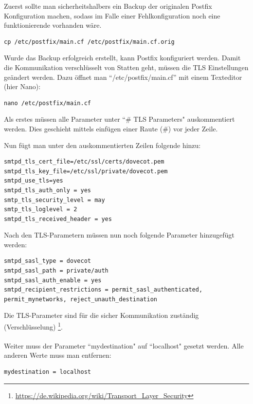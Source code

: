 Zuerst sollte man sicherheitshalbers ein Backup der originalen Postfix Konfiguration machen, sodass im Falle einer Fehlkonfiguration noch eine funktionierende vorhanden wäre. 

\begin{lstlisting}
cp /etc/postfix/main.cf /etc/postfix/main.cf.orig
\end{lstlisting}

Wurde das Backup erfolgreich erstellt, kann Postfix konfiguriert werden. Damit die Kommunikation verschlüsselt von Statten geht, müssen die TLS Einstellungen geändert werden.
Dazu öffnet man ``/etc/postfix/main.cf'' mit einem Texteditor (hier Nano):

\begin{lstlisting}
nano /etc/postfix/main.cf
\end{lstlisting}

Als erstes müssen alle Parameter unter ``\# TLS Parameters" auskommentiert werden. Dies geschieht mittels einfügen einer Raute (\#) vor jeder Zeile.

Nun fügt man unter den auskommentierten Zeilen folgende hinzu:

\begin{lstlisting}
smtpd_tls_cert_file=/etc/ssl/certs/dovecot.pem
smtpd_tls_key_file=/etc/ssl/private/dovecot.pem
smtpd_use_tls=yes
smtpd_tls_auth_only = yes
smtp_tls_security_level = may
smtp_tls_loglevel = 2
smtpd_tls_received_header = yes
\end{lstlisting}

Nach den TLS-Parametern müssen nun noch folgende Parameter hinzugefügt werden:

\begin{lstlisting}
smtpd_sasl_type = dovecot
smtpd_sasl_path = private/auth
smtpd_sasl_auth_enable = yes
smtpd_recipient_restrictions = permit_sasl_authenticated, permit_mynetworks, reject_unauth_destination
\end{lstlisting}

Die TLS-Parameter sind für die sicher Kommunikation zuständig (Verschlüsselung)
\footnote{\url{https://de.wikipedia.org/wiki/Transport\_Layer\_Security}}.
\\
\\
Weiter muss der Parameter ``mydestination" auf ``localhost" gesetzt werden. Alle anderen Werte muss man entfernen:

\begin{lstlisting}
mydestination = localhost
\end{lstlisting}

